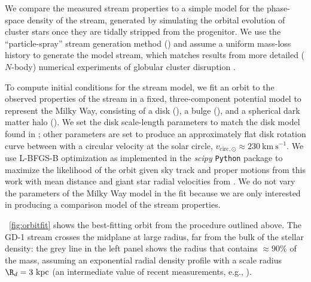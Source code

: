 \documentclass[modern]{aastex62}
\newcommand{\package}[1]{\textsl{#1}}
\newcommand{\kpc}{\textrm{kpc}}
\newcommand{\kms}{\ensuremath{\textrm{km}~\textrm{s}^{-1}}}
\begin{document}
We compare the measured stream properties to a simple model for the phase-space
density of the stream, generated by simulating the orbital evolution of cluster
stars once they are tidally stripped from the progenitor.
We use the ``particle-spray'' stream generation method (\citealt{Fardal:2015})
and assume a uniform mass-loss history to generate the model stream, which
matches results from more detailed ($N$-body) numerical experiments of globular
cluster disruption \citep[e.g.,][]{Kupper:2012}.

To compute initial conditions for the stream model, we fit an orbit to the
observed properties of the stream in a fixed, three-component potential model
to represent the Milky Way, consisting of a disk (\citealt{Miyamoto:1975}), a
bulge (\citealt{Hernquist:1990}), and a spherical dark matter halo
(\citealt{Navarro:1996}).
We set the disk scale-length parameters to match the disk model found in
\citet{Bovy:2015}; other parameters are set to produce an approximately flat
disk rotation curve between with a circular velocity at the solar circle,
$v_{\textrm{circ}, \odot} \approx 230~\kms$.
We use L-BFGS-B optimization as implemented in the \package{scipy}
\texttt{Python} package to maximize the likelihood of the orbit given sky track
and proper motions from this work with mean distance and giant star radial
velocities from \cite{Koposov:2010}.
We do not vary the parameters of the Milky Way model in the fit because we are
only interested in producing a comparison model of the stream properties.

\figurename~\ref{fig:orbitfit} shows the best-fitting orbit from the procedure
outlined above.
The GD-1 stream crosses the midplane at large radius, far from the bulk of the
stellar density:
the grey line in the left panel shows the radius that contains $\approx 90\%$ of
the mass, assuming an exponential radial density profile with a scale radius
$\R_d = 3~\kpc$ (an intermediate value of recent measurements, e.g.,
\citealt{Bovy:2012}).
\end{document}
